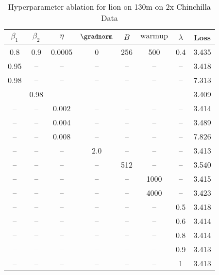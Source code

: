 \begin{table}[h!]
\centering
\caption{Hyperparameter ablation for lion on 130m on 2x Chinchilla Data}
\label{tab:ablation_lion_130m_on_2x_chinchilla_data}
\begin{tabular}{cccccccc}
\toprule
$\beta_1$ & $\beta_2$ & $\eta$ & $\gradnorm$ & $B$ & $\mathrm{warmup}$ & $\lambda$ & Loss \\
\midrule
0.8 & 0.9 & 0.0005 & 0 & 256 & 500 & 0.4 & 3.435 \\
\midrule
0.95 & -- & -- & -- & -- & -- & -- & 3.418 \\
0.98 & -- & -- & -- & -- & -- & -- & 7.313 \\
-- & 0.98 & -- & -- & -- & -- & -- & 3.409 \\
-- & -- & 0.002 & -- & -- & -- & -- & 3.414 \\
-- & -- & 0.004 & -- & -- & -- & -- & 3.489 \\
-- & -- & 0.008 & -- & -- & -- & -- & 7.826 \\
-- & -- & -- & 2.0 & -- & -- & -- & 3.413 \\
-- & -- & -- & -- & 512 & -- & -- & 3.540 \\
-- & -- & -- & -- & -- & 1000 & -- & 3.415 \\
-- & -- & -- & -- & -- & 4000 & -- & 3.423 \\
-- & -- & -- & -- & -- & -- & 0.5 & 3.418 \\
-- & -- & -- & -- & -- & -- & 0.6 & 3.414 \\
-- & -- & -- & -- & -- & -- & 0.8 & 3.414 \\
-- & -- & -- & -- & -- & -- & 0.9 & 3.413 \\
-- & -- & -- & -- & -- & -- & 1 & 3.413 \\
\bottomrule
\end{tabular}
\end{table}

